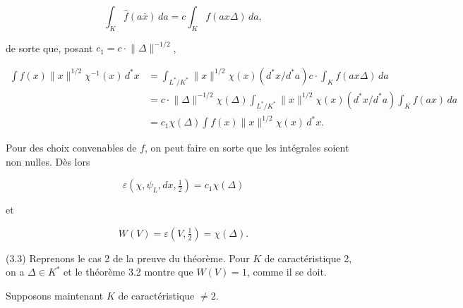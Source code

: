 \documentclass[9pt,twoside]{extarticle}
\begin{document}
{\[
\int_K\widehat f(a\bar x)\,da=c\int_K f(ax\Delta)\,da,
\]

de sorte que, posant \(c_1=c\cdot\lVert\Delta\rVert^{-1/2}\),\par

\[
\begin{aligned}
\int \widehat f(x)\lVert x\rVert^{1/2}\chi^{-1}(x)\,d^*x
&=\int_{L^*/K^*}\lVert x\rVert^{1/2}\chi(x)(d^*x/d^*a)c\cdot
  \int_K f(ax\Delta)\,da\\
&=c\cdot\lVert\Delta\rVert^{-1/2}\chi(\Delta)
  \int_{L^*/K^*}\lVert x\rVert^{1/2}\chi(x)(d^*x/d^*a)
  \int_K f(ax)\,da\\
&=c_1\chi(\Delta)\int f(x)\lVert x\rVert^{1/2}\chi(x)\,d^*x.
\end{aligned}
\]

Pour des choix convenables de \(f\), on peut faire en sorte que les intégrales soient non nulles. Dès lors\par

\[
\varepsilon\!\left(\chi,\psi_L,dx,\tfrac12\right)=c_1\chi(\Delta)
\]

et\par

\[
W(V)=\varepsilon\!\left(V,\tfrac12\right)=\chi(\Delta).
\]

(3.3) Reprenons le cas 2 de la preuve du théorème. Pour \(K\) de caractéristique 2, on a \(\Delta\in K^*\) et le théorème 3.2 montre que \(W(V)=1\), comme il se doit.\par

Supposons maintenant \(K\) de caractéristique \(\neq2\).\par
}
\end{document}
